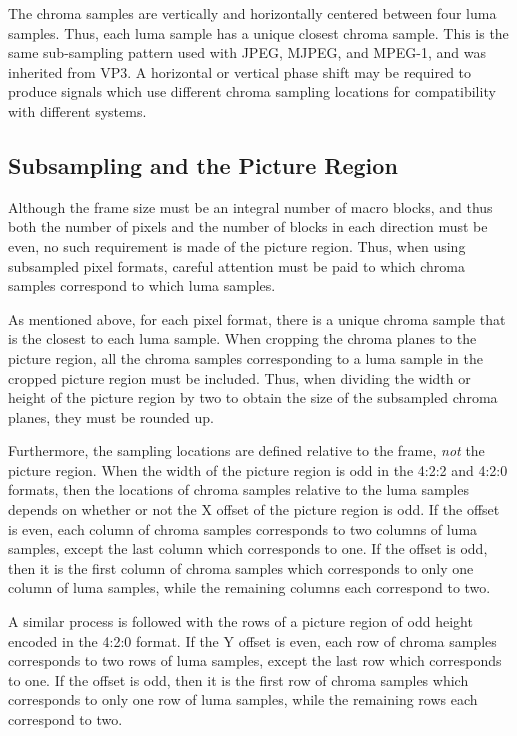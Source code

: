 \documentclass[11pt,letterpaper]{book}
\numberwithin{equation}{chapter}
\numberwithin{figure}{chapter}
\numberwithin{table}{chapter}
\begin{document}
The chroma samples are vertically and horizontally centered between four luma
 samples.
Thus, each luma sample has a unique closest chroma sample.
This is the same sub-sampling pattern used with JPEG, MJPEG, and MPEG-1, and
 was inherited from VP3.
A horizontal or vertical phase shift may be required to produce signals which
 use different chroma sampling locations for compatibility with different
 systems.

%
%
%
%
%
%
%
%
%
%

\subsection{Subsampling and the Picture Region}

Although the frame size must be an integral number of macro blocks, and thus
 both the number of pixels and the number of blocks in each direction must be
 even, no such requirement is made of the picture region.
Thus, when using subsampled pixel formats, careful attention must be paid to
 which chroma samples correspond to which luma samples.

As mentioned above, for each pixel format, there is a unique chroma sample that
 is the closest to each luma sample.
When cropping the chroma planes to the picture region, all the chroma samples
 corresponding to a luma sample in the cropped picture region must be included.
Thus, when dividing the width or height of the picture region by two to obtain
 the size of the subsampled chroma planes, they must be rounded up.

Furthermore, the sampling locations are defined relative to the frame,
 {\em not} the picture region.
When the width of the picture region is odd in the 4:2:2 and 4:2:0 formats,
 then the locations of chroma samples relative to the luma samples depends on
 whether or not the X offset of the picture region is odd.
If the offset is even, each column of chroma samples corresponds to two columns
 of luma samples, except the last column which corresponds to one.
If the offset is odd, then it is the first column of chroma samples which
 corresponds to only one column of luma samples, while the remaining columns
 each correspond to two.

A similar process is followed with the rows of a picture region of odd height
 encoded in the 4:2:0 format.
If the Y offset is even, each row of chroma samples corresponds to two rows of
 luma samples, except the last row which corresponds to one.
If the offset is odd, then it is the first row of chroma samples which
 corresponds to only one row of luma samples, while the remaining rows each
 correspond to two.
\end{document}
